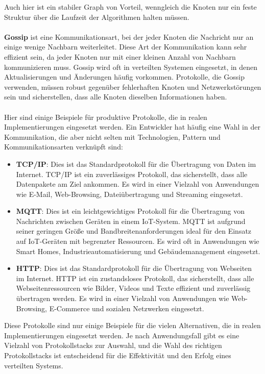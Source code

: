 \documentclass[../vs-script-first-v01.tex]{subfiles}
\begin{document}
Auch hier ist ein stabiler Graph von Vorteil, wenngleich die Knoten nur ein feste Struktur über die Laufzeit der Algorithmen halten müssen.
\\\\
\textbf{Gossip} ist eine Kommunikationsart, bei der jeder Knoten die Nachricht nur an einige wenige Nachbarn weiterleitet. Diese Art der Kommunikation kann sehr effizient sein, da jeder Knoten nur mit einer kleinen Anzahl von Nachbarn kommunizieren muss. Gossip wird oft in verteilten Systemen eingesetzt, in denen Aktualisierungen und Änderungen häufig vorkommen. Protokolle, die Gossip verwenden, müssen robust gegenüber fehlerhaften Knoten und Netzwerkstörungen sein und sicherstellen, dass alle Knoten dieselben Informationen haben.
\\\\
Hier sind einige Beispiele für produktive Protokolle, die in realen Implementierungen eingesetzt werden. Ein Entwickler hat häufig eine Wahl in der Kommunikation, die aber nicht selten mit Technologien, Pattern und Kommunikationsarten verknüpft sind:
 \begin{itemize}
\item \textbf{TCP/IP}: Dies ist das Standardprotokoll für die Übertragung von Daten im Internet. TCP/IP ist ein zuverlässiges Protokoll, das sicherstellt, dass alle Datenpakete am Ziel ankommen. Es wird in einer Vielzahl von Anwendungen wie E-Mail, Web-Browsing, Dateiübertragung und Streaming eingesetzt.

\item  \textbf{MQTT}: Dies ist ein leichtgewichtiges Protokoll für die Übertragung von Nachrichten zwischen Geräten in einem IoT-System. MQTT ist aufgrund seiner geringen Größe und Bandbreitenanforderungen ideal für den Einsatz auf IoT-Geräten mit begrenzter Ressourcen. Es wird oft in Anwendungen wie Smart Homes, Industrieautomatisierung und Gebäudemanagement eingesetzt.

\item \textbf{HTTP}: Dies ist das Standardprotokoll für die Übertragung von Webseiten im Internet. HTTP ist ein zustandsloses Protokoll, das sicherstellt, dass alle Webseitenressourcen wie Bilder, Videos und Texte effizient und zuverlässig übertragen werden. Es wird in einer Vielzahl von Anwendungen wie Web-Browsing, E-Commerce und sozialen Netzwerken eingesetzt.
 \end{itemize}
Diese Protokolle sind nur einige Beispiele für die vielen Alternativen, die in realen Implementierungen eingesetzt werden. Je nach Anwendungsfall gibt es eine Vielzahl von Protokollstacks zur Auswahl, und die Wahl des richtigen Protokollstacks ist entscheidend für die Effektivität und den Erfolg eines verteilten Systems.
\end{document}
